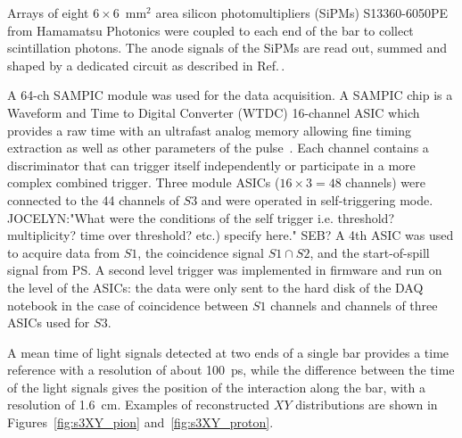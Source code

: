 Arrays of eight $6 \times 6$~mm$^2$ area silicon photomultipliers (SiPMs) S13360-6050PE from Hamamatsu Photonics \cite{Hamamatsu} were coupled to each end of the bar to collect scintillation photons. The anode signals of the SiPMs are read out, summed and shaped by a dedicated circuit as described in Ref.\,\cite{S3-readout}.

A 64-ch SAMPIC  module was used for the data acquisition. A SAMPIC chip is a Waveform and Time to Digital Converter (WTDC) 16-channel ASIC which provides a raw time with an ultrafast analog memory allowing fine timing extraction as well as other parameters of the pulse~\cite{SAMPIC}. Each channel contains a discriminator that can trigger itself independently or participate in a more complex combined trigger. 
Three module ASICs ($16\times3=48$ channels) were connected to the 44 channels of $S3$ and were operated in self-triggering mode. JOCELYN:"What were the conditions of the self trigger i.e. threshold? multiplicity? time over threshold? etc.) specify here." SEB?
A 4th ASIC was used to acquire data from $S1$, the coincidence signal $S1\cap S2$, and the start-of-spill signal from PS. A second level trigger was implemented in firmware and run on the level of the ASICs: the data were only sent to the hard disk of the DAQ notebook in the case of coincidence between $S1$ channels and channels of three ASICs used for $S3$.


A mean time of light signals detected at two ends of a single bar provides a time reference with a resolution of about 100~ps, while the difference between the time of the light signals gives the position of the interaction along the bar, with a resolution of 1.6~cm. Examples of reconstructed $XY$ distributions are shown in Figures~\ref{fig:s3XY_pion} and~\ref{fig:s3XY_proton}.


